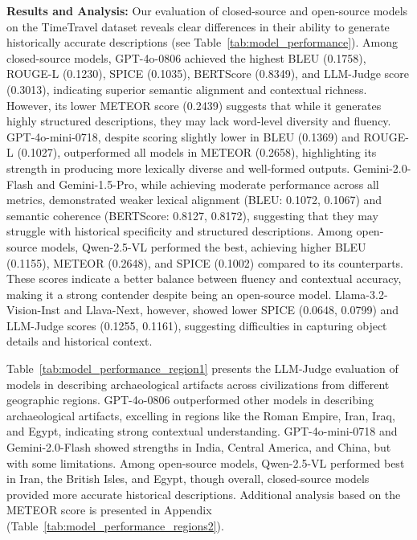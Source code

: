 \documentclass[11pt]{article}
\begin{document}
\noindent\textbf{Results and Analysis:}
Our evaluation of closed-source and open-source models on the TimeTravel dataset reveals clear differences in their ability to generate historically accurate descriptions (see Table~\ref{tab:model_performance}). Among closed-source models, GPT-4o-0806 achieved the highest BLEU (0.1758), ROUGE-L (0.1230), SPICE (0.1035), BERTScore (0.8349), and LLM-Judge score (0.3013), indicating superior semantic alignment and contextual richness. However, its lower METEOR score (0.2439) suggests that while it generates highly structured descriptions, they may lack word-level diversity and fluency. GPT-4o-mini-0718, despite scoring slightly lower in BLEU (0.1369) and ROUGE-L (0.1027), outperformed all models in METEOR (0.2658), highlighting its strength in producing more lexically diverse and well-formed outputs. Gemini-2.0-Flash and Gemini-1.5-Pro, while achieving moderate performance across all metrics, demonstrated weaker lexical alignment (BLEU: 0.1072, 0.1067) and semantic coherence (BERTScore: 0.8127, 0.8172), suggesting that they may struggle with historical specificity and structured descriptions.
Among open-source models, Qwen-2.5-VL performed the best, achieving higher BLEU (0.1155), METEOR (0.2648), and SPICE (0.1002) compared to its counterparts. These scores indicate a better balance between fluency and contextual accuracy, making it a strong contender despite being an open-source model. Llama-3.2-Vision-Inst and Llava-Next, however, showed lower SPICE (0.0648, 0.0799) and LLM-Judge scores (0.1255, 0.1161), suggesting difficulties in capturing object details and historical context. 

Table~\ref{tab:model_performance_region1} presents the LLM-Judge evaluation of models in describing archaeological artifacts across civilizations from different geographic regions. GPT-4o-0806 outperformed other models in describing archaeological artifacts, excelling in regions like the Roman Empire, Iran, Iraq, and Egypt, indicating strong contextual understanding. GPT-4o-mini-0718 and Gemini-2.0-Flash showed strengths in India, Central America, and China, but with some limitations. Among open-source models, Qwen-2.5-VL performed best in Iran, the British Isles, and Egypt, though overall, closed-source models provided more accurate historical descriptions. Additional analysis based on the METEOR score is presented in Appendix (Table~\ref{tab:model_performance_regions2}).
\end{document}
